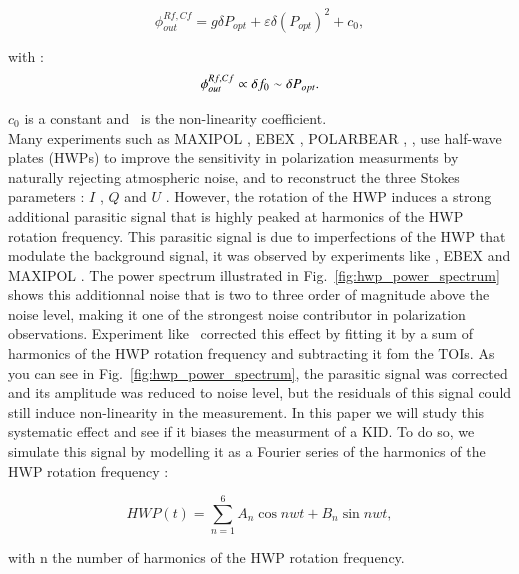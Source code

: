 \begin{equation}
\phi_{out}^{Rf,Cf} = g \delta P_{opt} + \varepsilon \delta (P_{opt})^2 +c_{0},
\label{eq:fit-nl}
\end{equation}

with : 
\begin{equation}
\phi_{out}^{Rf,Cf} \propto \delta f_{0} \sim \delta P_{opt}.\\
\end{equation}

$c_{0}$ is a constant and \eps\ is the non-linearity coefficient. \\

Many experiments such as MAXIPOL \citep{2007ApJ...665...42J}, EBEX
\citep{2010SPIE.7741E..1CR}, POLARBEAR \citep{2017JCAP...05..008T}, 
\citep{2017A&A...599A..34R}, use half-wave plates (HWPs) to improve the
sensitivity in polarization measurments by naturally rejecting atmospheric
noise, and to reconstruct the three Stokes parameters : $I$ , $Q$ and $U$
. However, the rotation of the HWP induces a strong additional parasitic signal
that is highly peaked at harmonics of the HWP rotation frequency. This parasitic
signal is due to imperfections of the HWP that modulate the background signal,
it was observed by experiments like  \citep{2017A&A...599A..34R}, EBEX
\citep{2010SPIE.7741E..1CR} and MAXIPOL \citep{2007ApJ...665...42J}.  The power
spectrum illustrated in Fig.~\ref{fig:hwp_power_spectrum} shows this additionnal
noise that is two to three order of magnitude above the noise level, making it
one of the strongest noise contributor in polarization observations. Experiment
like \nika\ corrected this effect by fitting it by a sum of harmonics of the HWP
rotation frequency and subtracting it fom the TOIs. As you can see in
Fig.~\ref{fig:hwp_power_spectrum}, the parasitic signal was corrected and its
amplitude was reduced to noise level, but the residuals of this signal could
still induce non-linearity in the measurement. In this paper we will study this
systematic effect and see if it biases the measurment of a KID. To do so, we
simulate this signal by modelling it as a Fourier series of the harmonics of the
HWP rotation frequency :

\begin{equation}
HWP(t) = \sum_{n=1}^{6} A_{n} \cos nwt + B_{n} \sin nwt , 
\label{eq:hwp-template}
\end{equation}

with n the number of harmonics of the HWP rotation frequency.

